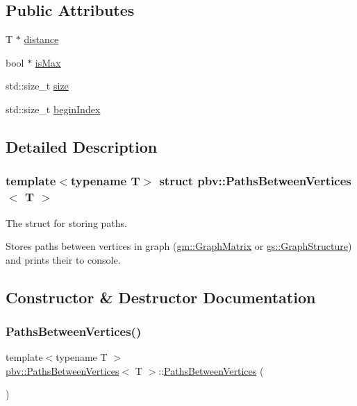 \subsection*{Public Attributes}
\begin{DoxyCompactItemize}
\item 
T $\ast$ \mbox{\hyperlink{structpbv_1_1_paths_between_vertices_a67aed042aa649d2b6dfeee29d3ec6416}{distance}}
\item 
bool $\ast$ \mbox{\hyperlink{structpbv_1_1_paths_between_vertices_a8d7391a03771f17ca699f519e64bf2a4}{is\+Max}}
\item 
std\+::size\+\_\+t \mbox{\hyperlink{structpbv_1_1_paths_between_vertices_a7ffee986b1b7f57a881a883b58bc67f4}{size}}
\item 
std\+::size\+\_\+t \mbox{\hyperlink{structpbv_1_1_paths_between_vertices_abf43c3771ed161bb80a73fe39e5cc916}{begin\+Index}}
\end{DoxyCompactItemize}


\subsection{Detailed Description}
\subsubsection*{template$<$typename T$>$\newline
struct pbv\+::\+Paths\+Between\+Vertices$<$ T $>$}

The struct for storing paths. 

Stores paths between vertices in graph (\mbox{\hyperlink{classgm_1_1_graph_matrix}{gm\+::\+Graph\+Matrix}} or \mbox{\hyperlink{classgs_1_1_graph_structure}{gs\+::\+Graph\+Structure}}) and prints their to console. 

\subsection{Constructor \& Destructor Documentation}
\mbox{\label{structpbv_1_1_paths_between_vertices_ab9812924cc3075c7501dd17d5a4f4d9c}} 
\subsubsection{\texorpdfstring{Paths\+Between\+Vertices()}{PathsBetweenVertices()}\hspace{0.1cm}{\footnotesize\ttfamily [1/4]}}
{\footnotesize\ttfamily template$<$typename T $>$ \\
\mbox{\hyperlink{structpbv_1_1_paths_between_vertices}{pbv\+::\+Paths\+Between\+Vertices}}$<$ T $>$\+::\mbox{\hyperlink{structpbv_1_1_paths_between_vertices}{Paths\+Between\+Vertices}} (\begin{DoxyParamCaption}{ }\end{DoxyParamCaption})}

